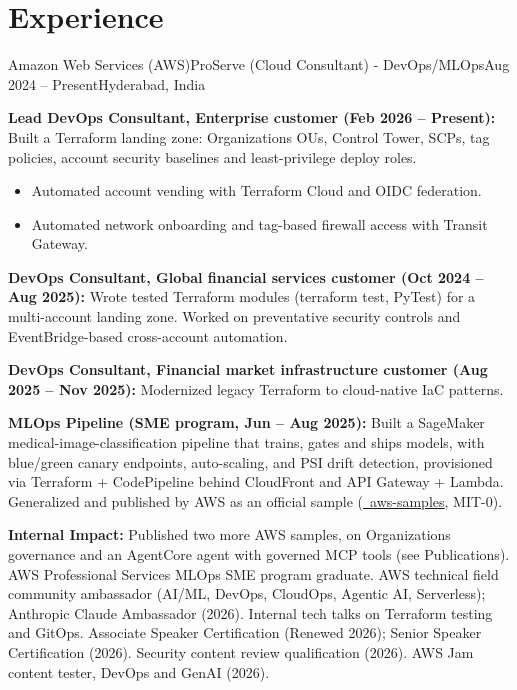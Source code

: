 \section{\textbf{Experience}}
\resumeSubHeadingListStart

\resumeExp
{Amazon Web Services (AWS)}{ProServe (Cloud Consultant) - DevOps/MLOps}{Aug 2024 -- Present}{Hyderabad, India}
\resumeItemListStart
    \item[$\diamond$] \textbf{Lead DevOps Consultant, Enterprise customer (Feb 2026 -- Present):} Built a Terraform landing zone: Organizations OUs, Control Tower, SCPs, tag policies, account security baselines and least-privilege deploy roles.
    \begin{itemize}[leftmargin=2.5ex, noitemsep, topsep=0pt, labelsep=1.2mm]
        \item[$\circ$] Automated account vending with Terraform Cloud and OIDC federation.
        \item[$\circ$] Automated network onboarding and tag-based firewall access with Transit Gateway.
    \end{itemize}
    \item[$\diamond$] \textbf{DevOps Consultant, Global financial services customer (Oct 2024 -- Aug 2025):} Wrote tested Terraform modules (terraform test, PyTest) for a multi-account landing zone. Worked on preventative security controls and EventBridge-based cross-account automation.
    \item[$\diamond$] \textbf{DevOps Consultant, Financial market infrastructure customer (Aug 2025 -- Nov 2025):} Modernized legacy Terraform to cloud-native IaC patterns.
    \item[$\diamond$] \textbf{MLOps Pipeline (SME program, Jun -- Aug 2025):} Built a SageMaker medical-image-classification pipeline that trains, gates and ships models, with blue/green canary endpoints, auto-scaling, and PSI drift detection, provisioned via Terraform + CodePipeline behind CloudFront and API Gateway + Lambda. Generalized and published by AWS as an official sample (\href{https://github.com/aws-samples/sample-sagemaker-image-classification-mlops}{\faGithub\ aws-samples}, MIT-0).
    \item[$\diamond$] \textbf{Internal Impact:} Published two more AWS samples, on Organizations governance and an AgentCore agent with governed MCP tools (see Publications). AWS Professional Services MLOps SME program graduate. AWS technical field community ambassador (AI/ML, DevOps, CloudOps, Agentic AI, Serverless); Anthropic Claude Ambassador (2026). Internal tech talks on Terraform testing and GitOps. Associate Speaker Certification (Renewed 2026); Senior Speaker Certification (2026). Security content review qualification (2026). AWS Jam content tester, DevOps and GenAI (2026).
\resumeItemListEnd

